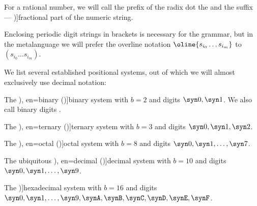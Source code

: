 \begin{definition}
  For a rational number, we will call the prefix of the radix dot the  and the suffix --- \term[en=fractional part (\cite[214]{Knuth1997ArtVol2})]{fractional part} of the numeric string.

  Enclosing periodic digit strings in brackets is necessary for the grammar, but in the metalanguage we will prefer the overline notation \( \oline{s_{i_0} \ldots s_{i_m}} \) to \( (s_{i_0} \ldots s_{i_m}) \).

  We list several established positional systems, out of which we will almost exclusively use decimal notation:
  \begin{thmenum}
     The \term[ru=двоичная (система) (\cite[60]{Зорич2019АнализЧасть1}), en=binary (\cite[195]{Knuth1997ArtVol2})]{binary} system with \( b = 2 \) and digits \( \syn0, \syn1 \). We also call binary digits .

     The \term[ru=троичная (система) (\cite[60]{Зорич2019АнализЧасть1}), en=ternary (\cite[195]{Knuth1997ArtVol2})]{ternary} system with \( b = 3 \) and digits \( \syn0, \syn1, \syn2 \).

     The \term[ru=восьмичная (система) (\cite[60]{Зорич2019АнализЧасть1}), en=octal (\cite[\S 4.2.2]{Rosen2019DiscreteMathematics})]{octal} system with \( b = 8 \) and digits \( \syn0, \syn1, \ldots, \syn7 \).

     The ubiquitous \term[ru=десетичная (система) (\cite[60]{Зорич2019АнализЧасть1}), en=decimal (\cite[195]{Knuth1997ArtVol2})]{decimal} system with \( b = 10 \) and digits \( \syn0, \syn1, \ldots, \syn9 \).

     The \term[en=hexadecimal (\cite[195]{Knuth1997ArtVol2})]{hexadecimal} system with \( b = 16 \) and digits \( \syn0, \syn1, \ldots, \syn9, \synA, \synB, \synC, \synD, \synE, \synF \).
  \end{thmenum}
\end{definition}
